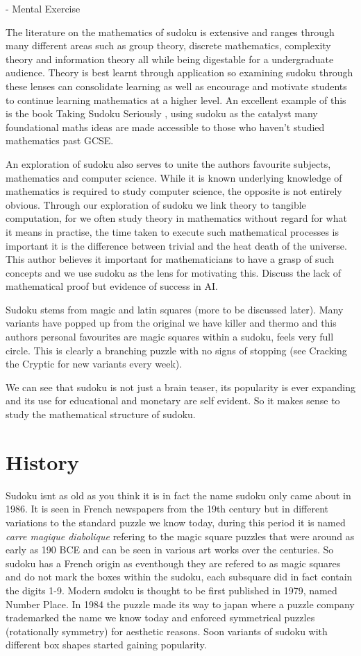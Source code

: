 \documentclass[a4paper,11pt]{report}
\begin{document}
- Mental Exercise 

The literature on the mathematics of sudoku is extensive and ranges through many different areas such as group theory, discrete mathematics, complexity theory and information theory all while being digestable for a undergraduate audience. Theory is best learnt through application so examining sudoku through these lenses can consolidate learning as well as encourage and motivate students to continue learning mathematics at a higher level. An excellent example of this is the book Taking Sudoku Seriously \cite{}, using sudoku as the catalyst many foundational maths ideas are made accessible to those who haven't studied mathematics past GCSE.

An exploration of sudoku also serves to unite the authors favourite subjects, mathematics and computer science. While it is known underlying knowledge of mathematics is required to study computer science, the opposite is not entirely obvious. Through our exploration of sudoku we link theory to tangible computation, for we often study theory in mathematics without regard for what it means in practise, the time taken to execute such mathematical processes is important it is the difference between trivial and the heat death of the universe. This author believes it important for mathematicians to have a grasp of such concepts and we use sudoku as the lens for motivating this. Discuss the lack of mathematical proof but evidence of success in AI.

Sudoku stems from magic and latin squares (more to be discussed later). Many variants have popped up from the original we have killer and thermo and this authors personal favourites are magic squares within a sudoku, feels very full circle. This is clearly a branching puzzle with no signs of stopping (see Cracking the Cryptic for new variants every week).

We can see that sudoku is not just a brain teaser, its popularity is ever expanding and its use for educational and monetary are self evident. So it makes sense to study the mathematical structure of sudoku.

\section{History}

Sudoku isnt as old as you think it is in fact the name sudoku only came about in 1986. It is seen in French newspapers from the 19th century but in different variations to the standard puzzle we know today, during this period it is named \textit{carre magique diabolique} refering to the magic square puzzles that were around as early as 190 BCE and can be seen in various art works over the centuries. So sudoku has a French origin as eventhough they are refered to as magic squares and do not mark the boxes within the sudoku, each subsquare did in fact contain the digits 1-9. Modern sudoku is thought to be first published in 1979, named Number Place. In 1984 the puzzle made its way to japan where a puzzle company trademarked the name we know today and enforced symmetrical puzzles (rotationally symmetry) for aesthetic reasons. Soon variants of sudoku with different box shapes started gaining popularity.
\end{document}
